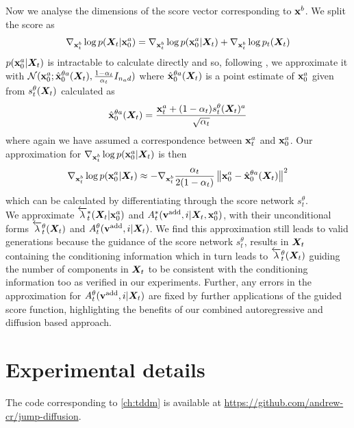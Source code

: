 Now we analyse the dimensions of the score vector corresponding to ${\mathbf{x}}^b$. We split the score as
\begin{equation}
    \nabla_{{\mathbf{x}}_t^b} \log p({\bm{X}}_t | {\mathbf{x}}_0^a) = \nabla_{{\mathbf{x}}_t^b} \log p({\mathbf{x}}_0^a | {\bm{X}}_t) + \nabla_{{\mathbf{x}}_t^b} \log p_t({\bm{X}}_t)
    \label{eq:condScoreSplit}
\end{equation}
$p({\mathbf{x}}_0^a | {\bm{X}}_t)$ is intractable to calculate directly and so, following \citet{ho2022video}, we approximate it with $\mathcal{N}({\mathbf{x}}_0^a ; \hat{{\mathbf{x}}}_0^{\theta a}({\bm{X}}_t), \frac{1 - \alpha_t}{\alpha_t} I_{n_a d})$ where $\hat{{\mathbf{x}}}_0^{\theta a}({\bm{X}}_t)$ is a point estimate of ${\mathbf{x}}_0^a$ given from $s_t^\theta({\bm{X}}_t)$ calculated as 
\begin{equation}
    \hat{{\mathbf{x}}}_0^{\theta a}({\bm{X}}_t) = \frac{{\mathbf{x}}_t^a + (1 - \alpha_t) s_t^\theta({\bm{X}}_t)^a}{\sqrt{\alpha_t}}
\end{equation}
where again we have assumed a correspondence between ${\mathbf{x}}_t^a$ and ${\mathbf{x}}_0^a$. Our approximation for $\nabla_{{\mathbf{x}}_t^b} \log p({\mathbf{x}}_0^a | {\bm{X}}_t)$ is then
\begin{equation}
    \nabla_{{\mathbf{x}}_t^b} \log p({\mathbf{x}}_0^a | {\bm{X}}_t) \approx - \nabla_{{\mathbf{x}}_t^b} \frac{\alpha_t}{2 ( 1- \alpha_t)} \left\lVert{\mathbf{x}}_0^a - \hat{{\mathbf{x}}}_0^{\theta a}({\bm{X}}_t) \right\rVert^2
\end{equation}
which can be calculated by differentiating through the score network $s_t^\theta$. \\

We approximate $\overleftarrow{\lambda}_t^*({\bm{X}}_t | {\mathbf{x}}_0^a)$ and $A_t^*({\mathbf{v}}^{\textup{add}}, i | {\bm{X}}_t, {\mathbf{x}}_0^a)$, with their unconditional forms $\overleftarrow{\lambda}_t^\theta({\bm{X}}_t)$ and $A_t^\theta({\mathbf{v}}^{\textup{add}}, i | {\bm{X}}_t)$. We find this approximation still leads to valid generations because the guidance of the score network $s_t^\theta$, results in ${\bm{X}}_t$ containing the conditioning information which in turn leads to $\overleftarrow{\lambda}_t^\theta({\bm{X}}_t)$ guiding the number of components in ${\bm{X}}_t$ to be consistent with the conditioning information too as verified in our experiments. Further, any errors in the approximation for $A_t^\theta({\mathbf{v}}^{\textup{add}}, i | {\bm{X}}_t)$ are fixed by further applications of the guided score function, highlighting the benefits of our combined autoregressive and diffusion based approach.







\section{Experimental details}
\label{sec:tddm-ExperimentDetails}
The code corresponding to \cref{ch:tddm} is available at \url{https://github.com/andrew-cr/jump-diffusion}.

